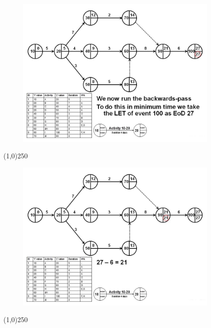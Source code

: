 \begin{frame}
\begin{figure}
	\centering
		\includegraphics[width = 10.0cm]{oldnotes/Slide111.jpg}
\end{figure}
\end{frame}
\begin{center}\line(1,0){250}\end{center}


\begin{frame}
\begin{figure}
	\centering
		\includegraphics[width = 10.0cm]{oldnotes/Slide112.jpg}
\end{figure}
\end{frame}
\begin{center}\line(1,0){250}\end{center}


